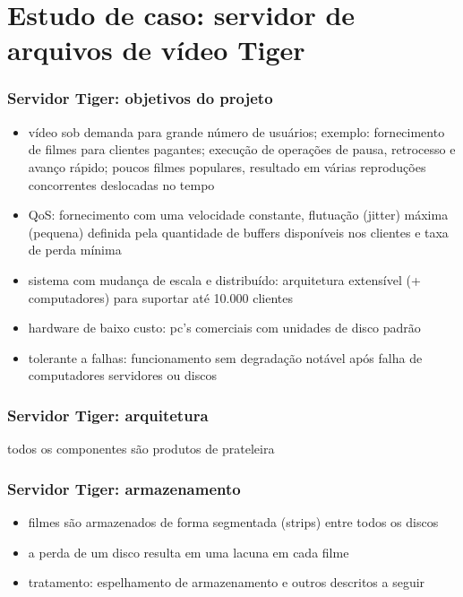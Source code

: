 \documentclass[]{beamer}
\begin{document}
\section{Estudo de caso: servidor de arquivos de vídeo Tiger}

\begin{frame}
 \frametitle{Servidor Tiger: objetivos do projeto}
 \begin{itemize}
   \item vídeo sob demanda para grande número de usuários; exemplo: fornecimento de filmes
para clientes pagantes; execução de operações de pausa, retrocesso e avanço rápido; poucos filmes
populares, resultado em várias reproduções concorrentes deslocadas no tempo
   \item QoS: fornecimento com uma velocidade constante, flutuação (jitter) máxima (pequena)
definida pela quantidade de buffers disponíveis nos clientes e taxa de perda mínima
   \item sistema com mudança de escala e distribuído: arquitetura extensível 
(+ computadores) para suportar até 10.000 clientes
   \item hardware de baixo custo: pc's comerciais com unidades de disco padrão
   \item tolerante a falhas: funcionamento sem degradação notável após falha de computadores 
servidores ou discos
  \end{itemize}
\end{frame}

\begin{frame}
 \frametitle{Servidor Tiger: arquitetura}
todos os componentes são produtos de prateleira
\end{frame}

\begin{frame}
 \frametitle{Servidor Tiger: armazenamento}
 \begin{itemize}
   \item filmes são armazenados de forma segmentada (strips) entre todos os discos
   \item a perda de um disco resulta em uma lacuna em cada filme
   \item tratamento: espelhamento de armazenamento e outros descritos a seguir
  \end{itemize}
\end{frame}
\end{document}
